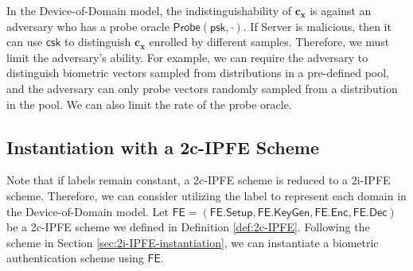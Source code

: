 In the Device-of-Domain model, the indistinguishability of $\mathbf{c_x}$ is against an adversary who has a probe oracle $\textsf{Probe}(\textsf{psk}, \cdot)$. If \textsf{Server} is malicious, then it can use $\textsf{csk}$ to distinguish $\mathbf{c_x}$ enrolled by different samples. Therefore, we must limit the adversary's ability. For example, we can require the adversary to distinguish biometric vectors sampled from distributions in a pre-defined pool, and the adversary can only probe vectors randomly sampled from a distribution in the pool. We can also limit the rate of the probe oracle.


\subsection{Instantiation with a 2c-IPFE Scheme}
\label{sec:2c-IPFE-instantiation}

Note that if labels remain constant, a 2c-IPFE scheme is reduced to a 2i-IPFE scheme. Therefore, we can consider utilizing the label to represent each domain in the Device-of-Domain model. Let $\textsf{FE} = (\textsf{FE.Setup}, \textsf{FE.KeyGen}, \textsf{FE.Enc}, \textsf{FE.Dec})$ be a 2c-IPFE scheme we defined in Definition \ref{def:2c-IPFE}. Following the scheme in Section \ref{sec:2i-IPFE-instantiation}, we can instantiate a biometric authentication scheme using $\textsf{FE}$.

